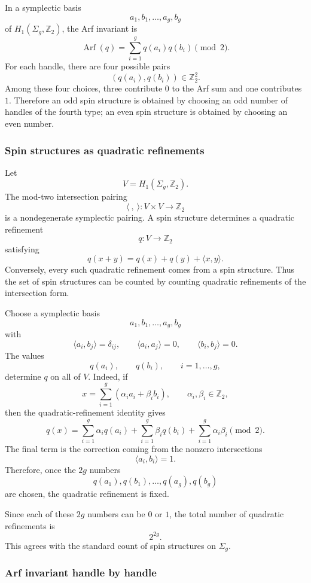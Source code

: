 \documentclass[
  10pt,
  a4paper,
  openany]{book}
\begin{document}
In a symplectic basis \[
a_1,b_1,\dots,a_g,b_g
\] of \(H_1(\Sigma_g,\mathbb Z_2)\), the Arf invariant is \[
\operatorname{Arf}(q)
=
\sum_{i=1}^g q(a_i)q(b_i)
\pmod 2.
\] For each handle, there are four possible pairs \[
\left(q(a_i),q(b_i)\right)\in\mathbb Z_2^2.
\] Among these four choices, three contribute \(0\) to the Arf sum and
one contributes \(1\). Therefore an odd spin structure is obtained by
choosing an odd number of handles of the fourth type; an even spin
structure is obtained by choosing an even number.

\subsubsection{Spin structures as quadratic
refinements}\label{spin-structures-as-quadratic-refinements}

Let \[
V=H_1(\Sigma_g,\mathbb Z_2).
\] The mod-two intersection pairing \[
\langle\ ,\ \rangle:V\times V\to\mathbb Z_2
\] is a nondegenerate symplectic pairing. A spin structure determines a
quadratic refinement \[
q:V\to\mathbb Z_2
\] satisfying \[
q(x+y)
=
q(x)+q(y)+\langle x,y\rangle.
\] Conversely, every such quadratic refinement comes from a spin
structure. Thus the set of spin structures can be counted by counting
quadratic refinements of the intersection form.

Choose a symplectic basis \[
a_1,b_1,\dots,a_g,b_g
\] with \[
\langle a_i,b_j\rangle=\delta_{ij},
\qquad
\langle a_i,a_j\rangle=0,
\qquad
\langle b_i,b_j\rangle=0.
\] The values \[
q(a_i),
\qquad
q(b_i),
\qquad
i=1,\dots,g,
\] determine \(q\) on all of \(V\). Indeed, if \[
x=\sum_{i=1}^g \left(\alpha_i a_i+\beta_i b_i\right),
\qquad
\alpha_i,\beta_i\in\mathbb Z_2,
\] then the quadratic-refinement identity gives \[
q(x)
=
\sum_{i=1}^g \alpha_i q(a_i)
+
\sum_{i=1}^g \beta_i q(b_i)
+
\sum_{i=1}^g \alpha_i\beta_i
\pmod 2.
\] The final term is the correction coming from the nonzero
intersections \[
\langle a_i,b_i\rangle=1.
\] Therefore, once the \(2g\) numbers \[
q(a_1),q(b_1),\dots,q(a_g),q(b_g)
\] are chosen, the quadratic refinement is fixed.

Since each of these \(2g\) numbers can be \(0\) or \(1\), the total
number of quadratic refinements is \[
2^{2g}.
\] This agrees with the standard count of spin structures on
\(\Sigma_g\).

\subsubsection{Arf invariant handle by
handle}\label{arf-invariant-handle-by-handle}
\end{document}
